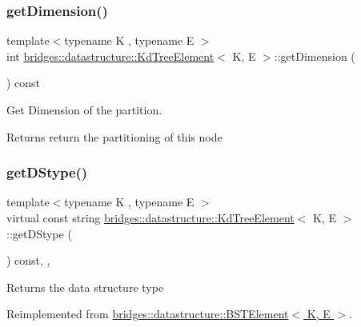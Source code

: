 \subsubsection{\texorpdfstring{get\+Dimension()}{getDimension()}}
{\footnotesize\ttfamily template$<$typename K , typename E $>$ \\
int \hyperlink{classbridges_1_1datastructure_1_1_kd_tree_element}{bridges\+::datastructure\+::\+Kd\+Tree\+Element}$<$ K, E $>$\+::get\+Dimension (\begin{DoxyParamCaption}{ }\end{DoxyParamCaption}) const\hspace{0.3cm}{\ttfamily [inline]}}



Get Dimension of the partition. 

\begin{DoxyReturn}{Returns}
return the partitioning of this node 
\end{DoxyReturn}
\mbox{\label{classbridges_1_1datastructure_1_1_kd_tree_element_a76f6d9bfadfdec09d0a8564aa0e33235}} 
\subsubsection{\texorpdfstring{get\+D\+Stype()}{getDStype()}}
{\footnotesize\ttfamily template$<$typename K , typename E $>$ \\
virtual const string \hyperlink{classbridges_1_1datastructure_1_1_kd_tree_element}{bridges\+::datastructure\+::\+Kd\+Tree\+Element}$<$ K, E $>$\+::get\+D\+Stype (\begin{DoxyParamCaption}{ }\end{DoxyParamCaption}) const\hspace{0.3cm}{\ttfamily [inline]}, {\ttfamily [override]}, {\ttfamily [virtual]}}

\begin{DoxyReturn}{Returns}
the data structure type 
\end{DoxyReturn}


Reimplemented from \hyperlink{classbridges_1_1datastructure_1_1_b_s_t_element_a2bb8cc9ec4b6bc5b89ecef0f17be366f}{bridges\+::datastructure\+::\+B\+S\+T\+Element$<$ K, E $>$}.


